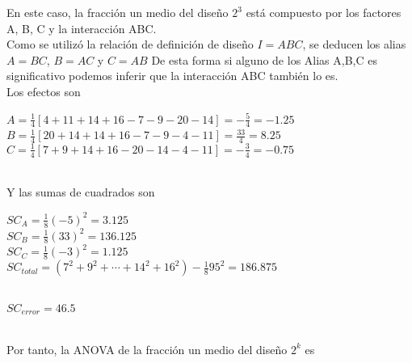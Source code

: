\documentclass[12pt]{beamer}
\begin{document}
\begin{frame}
En este caso, la fracción un medio del diseño $2^3$ está compuesto por los factores A, B, C y la interacción ABC.
~\\Como se utilizó la relación de definición de diseño $I=ABC$, se deducen los alias $A=BC$, $B=AC$ y $C=AB$ De esta forma si alguno de los Alias A,B,C es significativo podemos inferir que la interacción ABC también lo es.
~\\Los efectos son
\begin{center}
$A=\frac{1}{4}[4+11+14+16-7-9-20-14]=-\frac{5}{4}=-1.25$
~\\$B=\frac{1}{4}[20+14+14+16-7-9-4-11]=\frac{33}{4}=8.25$
~\\$C=\frac{1}{4}[7+9+14+16-20-14-4-11]=-\frac{3}{4}=-0.75$
\end{center}
~\\Y las sumas de cuadrados son
\begin{center}
$SC_A=\frac{1}{8}(-5)^2=3.125$
~\\$SC_B=\frac{1}{8}(33)^2=136.125$
~\\$SC_C=\frac{1}{8}(-3)^2=1.125$
~\\$SC_{total}=(7^2+9^2+\cdots+14^2+16^2)-\frac{1}{8}95^2=186.875$
\end{center}
\end{frame}


\begin{frame}
\begin{center}
~\\$SC_{error}=46.5$
\end{center}
~\\Por tanto, la ANOVA de la fracción un medio del diseño $2^k$ es
\begin{table}[H]
  \centering
  \caption{Análisis de varianza factorial fraccionado}
  \label{tab:addlabel}%
\end{table}%
\end{frame}
\end{document}
